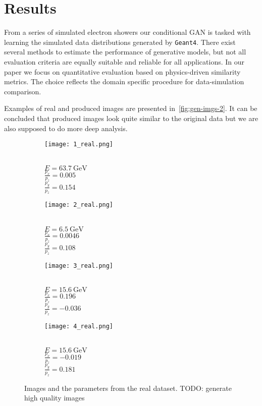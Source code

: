 \documentclass{webofc}
\newcommand{\todo}[1]{{\color{blue}TODO: #1}}
\begin{document}
\section{Results}
From a series of simulated electron showers our conditional GAN is tasked with learning the simulated data distributions generated by \texttt{Geant4}. There exist several methods to estimate the performance of generative models, but not all evaluation criteria are equally suitable and reliable for all applications. In our paper we focus on quantitative evaluation based on physics-driven similarity metrics. The choice reflects the domain specific procedure for data-simulation comparison. 

Examples of real and produced images are presented in~\cref{fig:gen-imgs-2}. It can be concluded that produced images look quite similar to the original data but we are also supposed to do more deep analysis.



\begin{figure}
\captionsetup[subfigure]{justification=centering}
  \centering
  \begin{subfigure}{0.24\textwidth}
    \centering
    \texttt{[image: 1\_real.png]}
    \caption{\\$E = 63.7~\text{GeV}$ \\ $\frac{p_x}{p_z}=0.005$ \\ $\frac{p_y}{p_z}=0.154$}\label{fig:real-imgs-1}
  \end{subfigure}
  \begin{subfigure}{0.24\textwidth}
    \centering
    \texttt{[image: 2\_real.png]}
    \caption{\\$E = 6.5~\text{GeV}$ \\  $\frac{p_x}{p_z}=0.0046$ \\$\frac{p_y}{p_z}=0.108$}\label{fig:real-imgs-2}
  \end{subfigure}
    \begin{subfigure}{0.24\textwidth}
    \centering
    \texttt{[image: 3\_real.png]}
    \caption{\\$E = 15.6~\text{GeV}$ \\ $\frac{p_x}{p_z}=0.196$ \\ $\frac{p_y}{p_z}=-0.036$}\label{fig:real-imgs-3}
  \end{subfigure}
  \begin{subfigure}{0.24\textwidth}
    \centering
    \texttt{[image: 4\_real.png]}
    \caption{\\$E = 15.6~\text{GeV}$ \\  $\frac{p_x}{p_z}=-0.019$ \\ $\frac{p_y}{p_z}=0.181$}\label{fig:real-imgs-4}
  \end{subfigure}
  \caption{Images and the parameters from the real dataset. \todo{generate high quality images}}
  \label{fig:real-imgs}
\end{figure}
\end{document}
